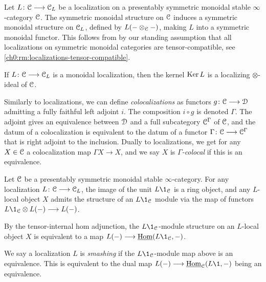 \begin{remark}
    \label{ch0:rm:monoidal-localization}
    Let $L\colon \EuScript{C}\longrightarrow \EuScript{C}_L$ be a localization on a presentably symmetric monoidal stable $\infty$-category $\EuScript{C}$. The symmetric monoidal structure on $\EuScript{C}$ induces a symmetric monoidal structure on $\EuScript{C}_L$, defined by $L(-\otimes_{\EuScript{C}} -)$, making $L$ into a symmetric monoidal functor. This follows from \cite[2.2.1.9]{Lurie_HA} by our standing assumption that all localizations on symmetric monoidal categories are tensor-compatible, see \cref{ch0:rm:localizations-tensor-compatible}. 
\end{remark}

\begin{remark}
    If $L\colon \EuScript{C}\longrightarrow \EuScript{C}_L$ is a monoidal localization, then the kernel $\operatorname{Ker} L$ is a localizing $\otimes$-ideal of $\EuScript{C}$. 
\end{remark}

\begin{remark}
    Similarly to localizations, we can define \emph{colocalizations} as functors $g\colon \EuScript{C}\longrightarrow \EuScript{D}$ admitting a fully faithful left adjoint $i$. The composition $i\circ g$ is denoted $\Gamma$. The adjoint gives an equivalence between $\EuScript{D}$ and a full subcategory $\EuScript{C}^\Gamma$ of $\EuScript{C}$, and the datum of a colocalization is equivalent to the datum of a functor $\Gamma\colon \EuScript{C}\longrightarrow \EuScript{C}^\Gamma$ that is right adjoint to the inclusion. Dually to localizations, we get for any $X\in \EuScript{C}$ a colocalization map $\Gamma X\to X$, and we say $X$ is \emph{$\Gamma$-colocal} if this is an equivalence. 
\end{remark}

Let $\EuScript{C}$ be a presentably symmetric monoidal stable $\infty$-category. For any localization $L\colon \EuScript{C}\longrightarrow \EuScript{C}_L$, the image of the unit $L\1_\C$ is a ring object, and any $L$-local object $X$ admits the structure of an $L\1_\C$ module via the map of functors $L\1_\C \otimes L(-)\longrightarrow L(-)$. 

\begin{remark}
    \label{ch0:rm:L1-module-adjoint-map}
    By the tensor-internal hom adjunction, the $L\1_\C$-module structure on an $L$-local object $X$ is equivalent to a map $L(-)\longrightarrow \iHom(L\1_\C,-)$. 
\end{remark}

\begin{definition}
    \label{ch0:def:smashing-localization}
    We say a localization $L$ is \emph{smashing} if the $L\1_\C$-module map above is an equivalence. This is equivalent to the dual map $L(-)\longrightarrow \iHom_\C(L\1, -)$ being an equivalence. 
\end{definition}

